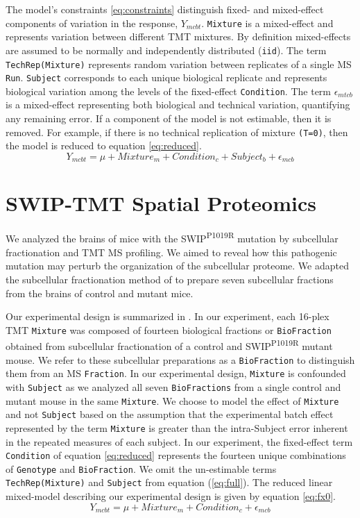 \documentclass[11pt]{elife}\usepackage[]{graphicx}\usepackage[]{color}
\begin{document}
The model's constraints \ref{eq:constraints} distinguish fixed- and mixed-effect
components of variation in the response, $Y_{mcbt}$. \texttt{Mixture} is a
mixed-effect and represents variation between different TMT mixtures. By
definition mixed-effects are assumed to be normally and independently
distributed (\texttt{iid}).  The term \texttt{TechRep(Mixture)} represents
random variation between replicates of a single MS \texttt{Run}.
\texttt{Subject} corresponds to each unique biological replicate and represents
biological variation among the levels of the fixed-effect \texttt{Condition}.
The term $\epsilon_{mtcb}$ is a mixed-effect representing both biological and
technical variation, quantifying any remaining error. If a component of the
model is not estimable, then it is removed.  For example, if there is no
technical replication of mixture \texttt{(T=0)}, then the model is reduced to
equation \ref{eq:reduced}.
\begin{equation} %
	\label{eq:reduced} %
	Y_{mcbt} = \mu + Mixture_m + Condition_c + Subject_b + \epsilon_{mcb}
\end{equation}


\section{SWIP-TMT Spatial Proteomics}

We analyzed the brains of mice with the SWIP\textsuperscript{P1019R} mutation by
subcellular fractionation and TMT MS profiling.  We aimed to reveal how this
pathogenic mutation may perturb the organization of the subcellular proteome.
We adapted the subcellular fractionation method of \cite{Geladaki2019} to
prepare seven subcellular fractions from the brains of control and mutant mice.

Our experimental design is summarized in .  In our experiment, each
16-plex TMT \texttt{Mixture} was composed of fourteen biological fractions or
\texttt{BioFraction} obtained from subcellular fractionation of a control and
SWIP\textsuperscript{P1019R} mutant mouse.  We refer to these subcellular
preparations as a \texttt{BioFraction} to distinguish them from an MS
\texttt{Fraction}. In our experimental design, \texttt{Mixture} is confounded
with \texttt{Subject} as we analyzed all seven \texttt{BioFractions} from a
single control and mutant mouse in the same \texttt{Mixture}.  We choose to
model the effect of \texttt{Mixture} and not \texttt{Subject} based on the
assumption that the experimental batch effect represented by the term
\texttt{Mixture} is greater than the intra-Subject error inherent in the
repeated measures of each subject.  In our experiment, the fixed-effect term
\texttt{Condition} of equation \ref{eq:reduced} represents the fourteen unique
combinations of \texttt{Genotype} and \texttt{BioFraction}.  We omit the
un-estimable terms \texttt{TechRep(Mixture)} and \texttt{Subject} from equation
(\ref{eq:full}). The reduced linear mixed-model describing our experimental
design is given by equation \ref{eq:fx0}.
\begin{equation}
	\label{eq:fx0}
	Y_{mcbt} = \mu + Mixture_m + Condition_c + \epsilon_{mcb}
\end{equation}
\end{document}

